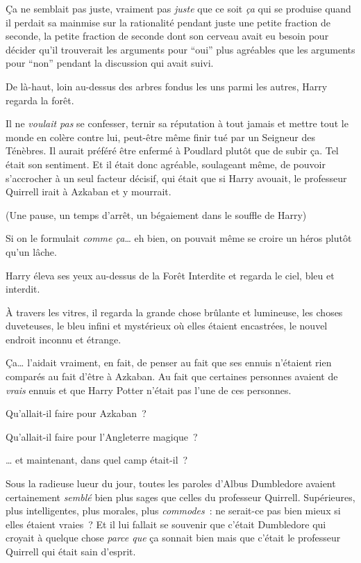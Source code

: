 Ça ne semblait pas juste, vraiment pas \emph{juste} que ce soit \emph{ça} qui se produise quand il perdait sa mainmise sur la rationalité pendant juste une petite fraction de seconde, la petite fraction de seconde dont son cerveau avait eu besoin pour décider qu'il trouverait les arguments pour “oui” plus agréables que les arguments pour “non” pendant la discussion qui avait suivi.

De là-haut, loin au-dessus des arbres fondus les uns parmi les autres, Harry regarda la forêt.

Il ne \emph{voulait pas} se confesser, ternir sa réputation à tout jamais et mettre tout le monde en colère contre lui, peut-être même finir tué par un Seigneur des Ténèbres.
Il aurait préféré être enfermé à Poudlard plutôt que de subir ça.
Tel était son sentiment.
Et il était donc agréable, soulageant même, de pouvoir s'accrocher à un seul facteur décisif, qui était que si Harry avouait, le professeur Quirrell irait à Azkaban et y mourrait.

(Une pause, un temps d'arrêt, un bégaiement dans le souffle de Harry)

Si on le formulait \emph{comme ça}… eh bien, on pouvait même se croire un héros plutôt qu'un lâche.

Harry éleva ses yeux au-dessus de la Forêt Interdite et regarda le ciel, bleu et interdit.

À travers les vitres, il regarda la grande chose brûlante et lumineuse, les choses duveteuses, le bleu infini et mystérieux où elles étaient encastrées, le nouvel endroit inconnu et étrange.

Ça… l'aidait vraiment, en fait, de penser au fait que ses ennuis n'étaient rien comparés au fait d'être à Azkaban.
Au fait que certaines personnes avaient de \emph{vrais} ennuis et que Harry Potter n'était pas l'une de ces personnes.

Qu'allait-il faire pour Azkaban~?

Qu'allait-il faire pour l'Angleterre magique~?

… et maintenant, dans quel camp était-il~?

Sous la radieuse lueur du jour, toutes les paroles d'Albus Dumbledore avaient certainement \emph{semblé} bien plus sages que celles du professeur Quirrell.
Supérieures, plus intelligentes, plus morales, plus \emph{commodes}~: ne serait-ce pas bien mieux si elles étaient vraies~?
Et il lui fallait se souvenir que c'était Dumbledore qui croyait à quelque chose \emph{parce que} ça sonnait bien mais que c'était le professeur Quirrell qui était sain d'esprit.

